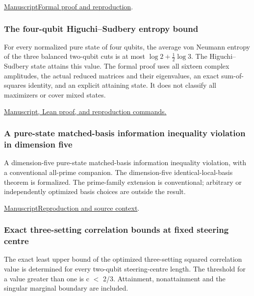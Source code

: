 \documentclass[11pt,a4paper]{article}
\begin{document}
\noindent\href{https://github.com/dvgyl/math-and-theory/blob/main/papers/physics/universal-embezzlement/manuscript.pdf}{Manuscript}\quad\href{https://github.com/dvgyl/math-and-theory/blob/main/papers/physics/universal-embezzlement/README.md}{Formal proof and reproduction}.

\subsubsection{The four-qubit Higuchi--Sudbery entropy bound}

For every normalized pure state of four qubits, the average von Neumann entropy of the three balanced two-qubit cuts is at most $\log 2+\tfrac12\log 3$. The Higuchi--Sudbery state attains this value. The formal proof uses all sixteen complex amplitudes, the actual reduced matrices and their eigenvalues, an exact sum-of-squares identity, and an explicit attaining state. It does not classify all maximizers or cover mixed states.

\href{https://github.com/dvgyl/math-and-theory/tree/main/papers/physics/higuchi-sudbery}{Manuscript, Lean proof, and reproduction commands.}

\subsubsection{A pure-state matched-basis information inequality violation in dimension five}

A dimension-five pure-state matched-basis information inequality violation, with a conventional all-prime companion. The dimension-five identical-local-basis theorem is formalized. The prime-family extension is conventional; arbitrary or independently optimized basis choices are outside the result.

\href{https://github.com/dvgyl/math-and-theory/blob/main/papers/physics/pure-ecqc/manuscript/manuscript.pdf}{Manuscript}\quad\href{https://github.com/dvgyl/math-and-theory/blob/main/papers/physics/pure-ecqc/README.md}{Reproduction and source context}.

\subsubsection{Exact three-setting correlation bounds at fixed steering centre}

The exact least upper bound of the optimized three-setting squared correlation value is determined for every two-qubit steering-centre length. The threshold for a value greater than one is c $<$ 2/3. Attainment, nonattainment and the singular marginal boundary are included.
\end{document}
